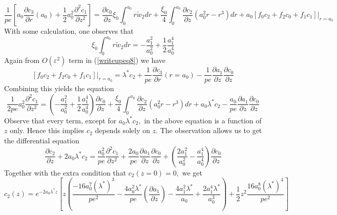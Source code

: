 \documentclass[12pt]{article}
\renewcommand{\(}{\left (}
\renewcommand{\)}{\right )}
\begin{document}
\begin{equation}
    \frac{1}{pe} \left[ a_0 \frac{\partial c_{3}}{\partial r}\left(a_{0}\right)+\frac{1}{2} a_{0}^{2} \frac{\partial^{2} c_{1}}{\partial z^{2}} \right] = \frac{\partial c_0}{\partial z} \xi_{0} \int_0^{a_0} r \tilde{w}_{2}  d r + \frac{\xi_0}{4} \int_0^{a_0} \frac{\partial c_2}{\partial z} (a_0^2 r - r^3)dr + a_0 \left.\left[f_{0} c_{2}+ f_{2} c_0 +f_{1} c_{1}\right]\right|_{r=a_{0}}
\end{equation}
With some calculation, one observes that
\begin{equation}
    \xi_0 \int_0^{a_0}  r \tilde{w}_{2}  d r  = -\frac{a_1^2}{a_0^2}+\frac{1}{2}\frac{a_1^4}{a_0^4}
\end{equation}
Again from $O(\varepsilon^2)$ term in (\ref{writeupeq8}) we have
\begin{equation}
    \left.\left[f_{0} c_{2}+ f_{2} c_0 +f_{1} c_{1}\right]\right|_{r=a_{0}} = \lambda^{*} c_{2}+\frac{1}{pe} \frac{\partial c_3}{\partial r}\left(r=a_{0}\right) -\frac{1}{p e} \frac{\partial a_{1}}{\partial z} \frac{\partial c_{0}}{\partial z}
\end{equation}
Combining this yields the equation
\begin{equation}
    \frac{1}{2pe} a_{0}^{2} \frac{\partial^{2} c_{1}}{\partial z^{2}} = \left(-\frac{a_1^2}{a_0^2}+\frac{1}{2}\frac{a_1^4}{a_0^4}\right) \frac{\partial c_0}{\partial z} + \frac{\xi_0}{4} \int_0^{a_0} \frac{\partial c_2}{\partial z} (a_0^2 r - r^3)dr  + a_0 \lambda^* c_2 - \frac{a_0}{pe}\frac{\partial a_1}{\partial z} \frac{\partial c_0}{ \partial z}
\end{equation}
Observe that every term, except for $a_0 \lambda^* c_2,$ in the above equation is a function of $z$ only. Hence this implies $c_2$ depends solely on $z.$ The observation allows us to get the differential equation
\begin{equation}
    \frac{\partial c_2}{\partial z}+2 a_{0} \lambda^{*} c_{2}=
    \frac{a_{0}^{2}}{p e} \frac{\partial^{2} c_1}{\partial z^{2}} + \frac{2 a_{0}}{p e} \frac{\partial a_{1}}{\partial z} \frac{\partial c_{0}}{\partial z} +\left(\frac{2 a_1^{2}}{a_0^2}-\frac{a_{1}^{4}}{a_{0}^{4}}\right) \frac{\partial c_{0}}{\partial z}
\end{equation}
Together with the extra condition that $c_2(z=0) =0,$
we get
\begin{equation}
    c_2(z) = e^{-2a_0 \lambda^*z} \left[ z\left( \frac{-16 a_0^7 (\lambda^*)^3}{pe^2} - \frac{4a_0^2 \lambda^*}{pe}\left(\frac{\partial a_1}{\partial z}\right) - \frac{4a_1^2 \lambda^*}{a_0} + \frac{2a_1^4 \lambda^*}{a_0^3}\right)+ \frac{1}{2}z^2 \frac{16 a_0^8 (\lambda^*)^4}{pe^2}\right]
\end{equation}
\end{document}
